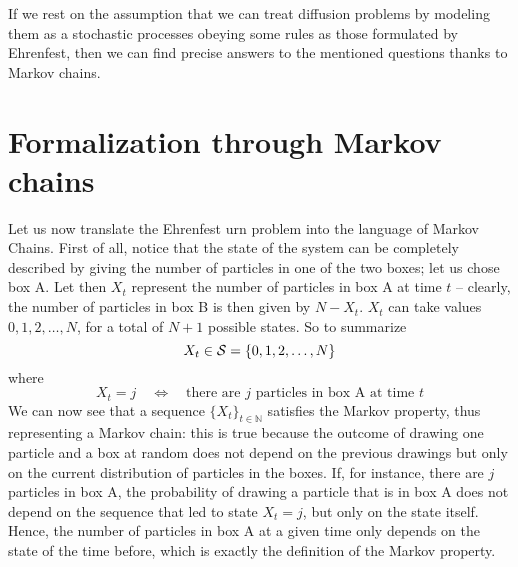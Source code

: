 If we rest on the assumption that we can treat diffusion problems by modeling them as a stochastic processes obeying some rules as those formulated by Ehrenfest, then we can find precise answers to the mentioned questions thanks to Markov chains.

\section{Formalization through Markov chains}
Let us now translate the Ehrenfest urn problem into the language of Markov Chains. 
First of all, notice that the state of the system can be completely described by giving the number of particles in one of the two boxes; let us chose box A. Let then $X_t$ represent the number of particles in box A at time $t$ -- clearly, the number of particles in box B is then given by $N - X_t$. $X_t$ can take values $0, 1, 2, \dots, N$, for a total of $N + 1$ possible states. So to summarize
\begin{equation}
    X_t \in \mathcal{S} = \{ 0, 1, 2, \dots, N \}
\end{equation}
where
\begin{equation}
    X_t = j \quad \Leftrightarrow \quad \text{there are $j$ particles in box A at time $t$}
\end{equation}
We can now see that a sequence $\{X_t\}_{t\in \mathbb{N}}$ satisfies the Markov property, thus representing a Markov chain: this is true because the outcome of drawing one particle and a box at random does not depend on the previous drawings but only on the current distribution of particles in the boxes. If, for instance, there are $j$ particles in box A, the probability of drawing a particle that is in box A does not depend on the sequence that led to state $X_t = j$, but only on the state itself. Hence, the number of particles in box A at a given time only depends on the state of the time before, which is exactly the definition of the Markov property.

